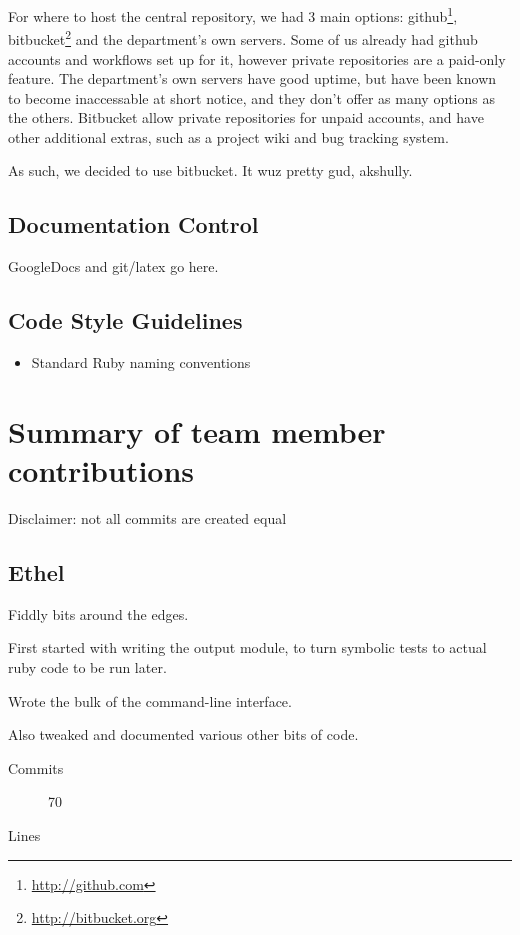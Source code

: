       For where to host the central repository, we had 3 main options: github\footnote{\url{http://github.com}}, bitbucket\footnote{\url{http://bitbucket.org}} and the department's own servers.
      Some of us already had github accounts and workflows set up for it, however private repositories are a paid-only feature.
      The department's own servers have good uptime, but have been known to become inaccessable at short notice, and they don't offer as many options as the others.
      Bitbucket allow private repositories for unpaid accounts, and have other additional extras, such as a project wiki and bug tracking system.

			As such, we decided to use bitbucket.
			It wuz pretty gud, akshully.

    \subsection{Documentation Control}
			GoogleDocs and git/latex go here.

  \subsection{Code Style Guidelines}
    \begin{itemize}
      \item Standard Ruby naming conventions
    \end{itemize}


\section{Summary of team member contributions}
Disclaimer: not all commits are created equal

  \subsection{Ethel}
    Fiddly bits around the edges.

    First started with writing the output module, to turn symbolic tests to actual ruby code to be run later.

    Wrote the bulk of the command-line interface.

    Also tweaked and documented various other bits of code.
    \begin{description}
      \item[Commits] 70
      \item[Lines]
    \end{description}

